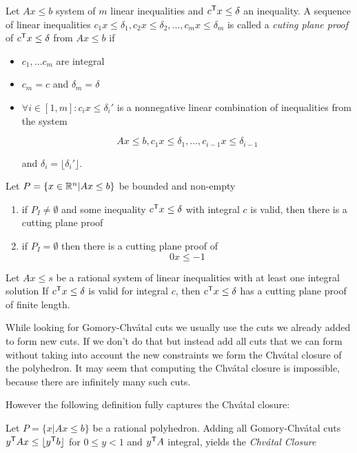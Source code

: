\begin{Def} Let $Ax\leq b$ system of $m$ linear inequalities and ${c}^\text{\upshape \sffamily T}x\leq \delta$ an inequality. A sequence of linear inequalities $c_1x\leq \delta_1, c_2x\leq \delta_2,\ldots, c_mx\leq \delta_m$ is called a \emph{cuting plane proof} of ${c}^\text{\upshape \sffamily T} x\leq \delta$ from $Ax\leq b$ if
\begin{itemize}
\item $c_1,\ldots c_m$ are integral
\item $c_m=c$ and $\delta_m=\delta$
\item $\forall i\in [1,m]: c_ix\leq \delta_i'$ is a nonnegative linear combination of inequalities from the system

\[Ax\leq b, c_1x\leq \delta_1,\ldots,c_{i-1}x\leq \delta_{i-1}\]

and $\delta_i=\lfloor \delta_i'\rfloor$.
\end{itemize}
\end{Def}

\begin{thm}[Existence] Let $P=\{x\in \mathbb{R}^n | Ax\leq b\}$ be bounded and non-empty

\begin{enumerate}
\item if $P_I\neq \emptyset$ and some inequality ${c}^\text{\upshape \sffamily T} x\leq \delta$ with integral $c$ is valid, then there is a cutting plane proof
\item if $P_I=\emptyset$ then there is a cutting plane proof of 
\[0x\leq -1\]
\end{enumerate}
\end{thm}

\begin{thm} Let $Ax\leq s$ be a rational system of linear inequalities with at least one integral solution If ${c}^\text{\upshape \sffamily T}x\leq \delta$ is valid for integral $c$, then ${c}^\text{\upshape \sffamily T}x\leq \delta$ has a cutting plane proof of finite length.
\end{thm}

While looking for Gomory-Chv\'{a}tal cuts we usually use the cuts we already added to form new cuts. If we don't do that but instead add all cuts that we can form without taking into account the new constraints we form the Chv\'{a}tal closure of the polyhedron. It may seem that computing the Chv\'atal closure is impossible, because there are infinitely many such cuts.

However the following definition fully captures the Chv\'atal closure:

\begin{Def} Let $P=\{x|Ax\leq b\}$ be a rational polyhedron. Adding all Gomory-Chv\'{a}tal cuts ${y}^\text{\upshape \sffamily T}Ax\leq \lfloor {y}^\text{\upshape \sffamily T} b\rfloor$ for $0\leq y < 1$ and ${y}^\text{\upshape \sffamily T} A$ integral, yields the \emph{Chv\'{a}tal Closure}
\end{Def}

